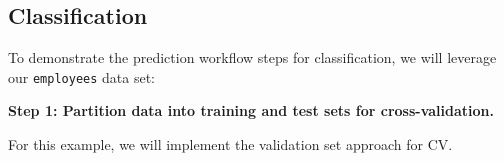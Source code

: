 \documentclass[
]{book}
\newenvironment{Shaded}{\begin{snugshade}}{\end{snugshade}}
\newcommand{\CommentTok}[1]{\textcolor[rgb]{0.56,0.35,0.01}{\textit{#1}}}
\newcommand{\DecValTok}[1]{\textcolor[rgb]{0.00,0.00,0.81}{#1}}
\newcommand{\FunctionTok}[1]{\textcolor[rgb]{0.00,0.00,0.00}{#1}}
\newcommand{\NormalTok}[1]{#1}
\newcommand{\OtherTok}[1]{\textcolor[rgb]{0.56,0.35,0.01}{#1}}
\newcommand{\SpecialCharTok}[1]{\textcolor[rgb]{0.00,0.00,0.00}{#1}}
\newcommand{\StringTok}[1]{\textcolor[rgb]{0.31,0.60,0.02}{#1}}
\begin{document}
\hypertarget{classification}{%
\subsection{Classification}\label{classification}}

To demonstrate the prediction workflow steps for classification, we will leverage our \texttt{employees} data set:

\begin{Shaded}
\end{Shaded}

\textbf{Step 1: Partition data into training and test sets for cross-validation.}

For this example, we will implement the validation set approach for CV.
\end{document}
